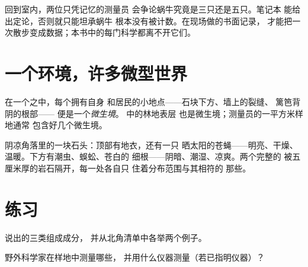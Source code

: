 \begin{remark}[为什么记录胜过记忆]\label{rem:g6:exploring-our-environment:records}
回到室内，两位只凭记忆的测量员
会争论蜗牛究竟是三只还是五只。笔记本
能给出定论，否则就只能坦承蜗牛
根本没有被计数。在现场做的书面记录，
才能把一次散步变成数据；本书中的每门科学都离不开它们。
\end{remark}

\section{一个环境，许多微型世界}

\begin{definition}[微生境]\label{def:g6:exploring-our-environment:microhabitat}
在一个之中，每个拥有自身
和居民的小地点——石块下方、墙上的裂缝、
篱笆背阴的根部——
便是一个\emph{微生境}。
中的林地表层
也是微生境；测量员的一平方米样地通常
包含好几个微生境。
\end{definition}

\begin{example}[石块的上方与下方]\label{ex:g6:exploring-our-environment:stone}
阴凉角落里的一块石头：顶部有地衣，还有一只
晒太阳的苍蝇——明亮、干燥、温暖。下方有潮虫、蜈蚣、苍白的
细根——阴暗、潮湿、凉爽。两个完整的
被五厘米厚的岩石隔开，每一处各自只
住着分布范围与其相符的
那些。
\end{example}

\section{练习}

\begin{exercise}[$\star$]\label{exo:g6:exploring-our-environment:1}
说出的三类组成成分，
并从北角清单中各举两个例子。
\end{exercise}

\begin{exercise}[$\star$]\label{exo:g6:exploring-our-environment:2}
野外科学家在样地中测量哪些，
并用什么仪器测量（若已指明仪器）？
\end{exercise}

